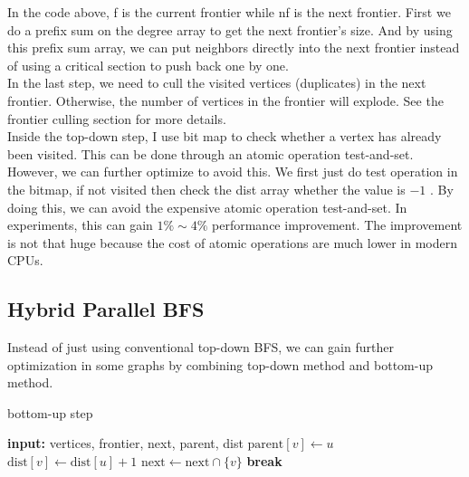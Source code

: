\documentclass[10pt,twocolumn,letterpaper]{article}
\begin{document}
In the code above, f is the current frontier while nf is the next frontier. First we do a prefix sum on the degree array to get the next frontier's size. And by using this prefix sum array, we can put neighbors directly into the next frontier instead of using a critical section to push back one by one.\\
In the last step, we need to cull the visited vertices (duplicates) in the next frontier. Otherwise, the number of vertices in the frontier will explode. See the frontier culling section for more details.\\
Inside the top-down step, I use bit map to check whether a vertex has already been visited. This can be done through an atomic operation test-and-set. However, we can further optimize to avoid this. We first just do test operation in the bitmap, if not visited then check the dist array whether the value is $-1$ \cite{6113790,10.1145/1810479.1810534}. By doing this, we can avoid the expensive atomic operation test-and-set. In experiments, this can gain $1\% \sim 4\%$ performance improvement. The improvement is not that huge because the cost of atomic operations are much lower in modern CPUs.

\subsection{Hybrid Parallel BFS}

Instead of just using conventional top-down BFS, we can gain further optimization in some graphs by combining top-down method and bottom-up method.\\
\begin{algorithm}
    \caption{bottom-up step} 
	\label{bottomupstep}
    \begin{algorithmic}
        \STATE \textbf{input: }vertices, frontier, next, parent, dist
                        \STATE $\text{parent}[v] \gets u$
                        \STATE $\text{dist}[v] \gets \text{dist}[u] + 1$
                        \STATE $\text{next} \gets \text{next} \cap \{v\}$
                        \STATE \textbf{break}
                    \ENDIF
                \ENDFOR
            \ENDIF
        \ENDFOR
    \end{algorithmic}
\end{algorithm}
\end{document}
